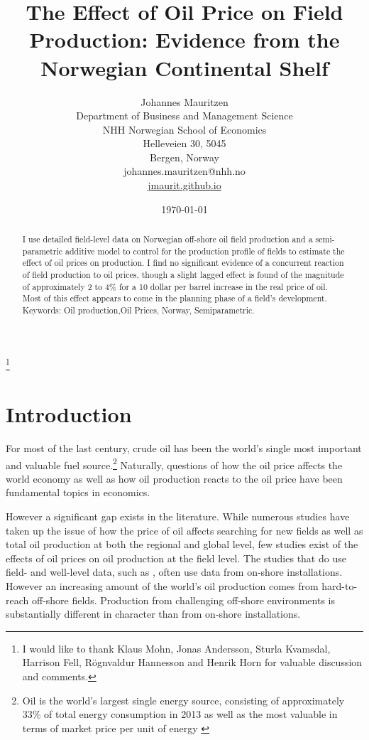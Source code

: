 \documentclass[11pt]{article}
\title{The Effect of Oil Price on Field Production: Evidence from the Norwegian Continental Shelf}
\author{Johannes Mauritzen\\
		Department of Business and Management Science\\
        NHH Norwegian School of Economics\\
        Helleveien 30, 5045\\
        Bergen, Norway\\
        johannes.mauritzen@nhh.no\\
        \url{jmaurit.github.io}\\
		}
\date{\today}
\begin{document}
 \begin{spacing}{1} %
	\maketitle


\begin{abstract}
I use detailed field-level data on Norwegian off-shore oil field production and a semi-parametric additive model to control for the production profile of fields to estimate the effect of oil prices on production.  I find no significant evidence of a concurrent reaction of field production to oil prices, though a slight lagged effect is found of the magnitude of approximately 2 to 4\% for a 10 dollar per barrel increase in the real price of oil.  Most of this effect appears to come in the planning phase of a field's development.\\
Keywords: Oil production,Oil Prices, Norway, Semiparametric.
\end{abstract}

\thanks{I would like to thank Klaus Mohn, Jonas Andersson, Sturla Kvamsdal, Harrison Fell, R\"ognvaldur Hannesson and Henrik Horn for valuable discussion and comments.}
 \end{spacing}

\section{Introduction}

For most of the last century, crude oil has been the world’s single most important and valuable fuel source.\footnote{Oil is the world's largest single energy source, consisting of approximately 33\% of total energy consumption in 2013 as well as the most valuable in terms of market price per unit of energy \citep{british_petroleum_statistical_2013}} Naturally, questions of how the oil price affects the world economy as well as how oil production reacts to the oil price have been fundamental topics in economics. 

However a significant gap exists in the literature.  While numerous studies have taken up the issue of how the price of oil affects searching for new fields as well as total oil production at both the regional and global level, few studies exist of the effects of oil prices on oil production at the field level.  The studies that do use field- and well-level data, such as \citet{rao_taxation_2010}, often use data from on-shore installations.  However an increasing amount of the world's oil production comes from hard-to-reach off-shore fields.  Production from challenging off-shore environments is substantially different in character than from on-shore installations.
\end{document}
